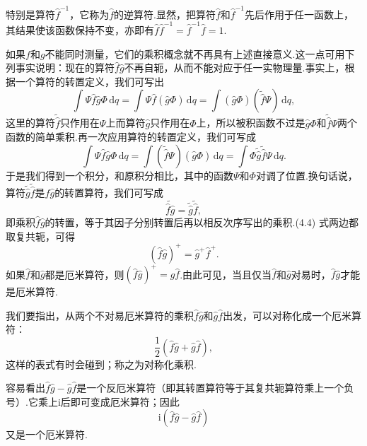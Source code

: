 特别是算符$\hat{f}^{-1}$，它称为$\hat{f}$的逆算符.显然，把算符$\hat{f}$和$\hat{f}^{-1}$先后作用于任一函数上，其结果使该函数保持不变，亦即有$\hat{f}\hat{f}^{-1}=\hat{f}^{-1}\hat{f}=1$.

如果$f$和$g$不能同时测量，它们的乘积概念就不再具有上述直接意义.这一点可用下列事实说明：现在的算符$\hat{f}\hat{g}$不再自轭，从而不能对应于任一实物理量.事实上，根据一个算符的转置定义，我们可写出
\begin{equation*}
  \int\varPsi\hat{f}\hat{g}\varPhi\,\mathrm{d}q
  =\int\varPsi\hat{f}(\hat{g}\varPhi)\,\mathrm{d}q
  =\int(\hat{g}\varPhi)(\tilde{\hat{f}}\varPsi)\,\mathrm{d}q,
\end{equation*}
这里的算符$\tilde{\hat{f}}$只作用在$\varPsi$上而算符$\hat{g}$只作用在$\varPhi$上，所以被积函数不过是$\hat{g}\varPhi$和$\tilde{\hat{f}}\varPsi$两个函数的简单乘积.再一次应用算符的转置定义，我们可写成
\begin{equation*}
  \int\varPsi\hat{f}\hat{g}\varPhi\,\mathrm{d}q
  =\int(\tilde{\hat{f}}\varPsi)(\hat{g}\varPhi)\,\mathrm{d}q
  =\int\varPhi\tilde{\hat{g}}\tilde{\hat{f}}\varPsi\,\mathrm{d}q.
\end{equation*}
于是我们得到一个积分，和原积分相比，其中的函数$\varPsi$和$\varPhi$对调了位置.换句话说，算符$\tilde{\hat{g}}\tilde{\hat{f}}$是$\hat{f}\hat{g}$的转置算符，我们可写成
\begin{equation}
  \widetilde{\hat{f}\hat{g}}=\tilde{\hat{g}}\tilde{\hat{f}},
\end{equation}
即乘积$\hat{f}\hat{g}$的转置，等于其因子分别转置后再以相反次序写出的乘积.(4.4) 式两边都取复共轭，可得
\begin{equation}
  (\hat{f}\hat{g})^{+}=\hat{g}^{+}\hat{f}^{+}.
\end{equation}
如果$\hat{f}$和$\hat{g}$都是厄米算符，则$(\hat{f}\hat{g})^{+}=\hat{g}\hat{f}$.由此可见，当且仅当$\hat{f}$和$\hat{g}$对易时，$\hat{f}\hat{g}$才能是厄米算符.

我们要指出，从两个不对易厄米算符的乘积$\hat{f}\hat{g}$和$\hat{g}\hat{f}$出发，可以对称化成一个厄米算符：
\begin{equation}
  \frac{1}{2}(\hat{f}\hat{g}+\hat{g}\hat{f}),
\end{equation}
这样的表式有时会碰到；称之为对称化乘积.

容易看出$\hat{f}\hat{g}-\hat{g}\hat{f}$是一个反厄米算符（即其转置算符等于其复共轭算符乘上一个负号）.它乘上$\mathrm{i}$后即可变成厄米算符；因此
\begin{equation}
  \mathrm{i}(\hat{f}\hat{g}-\hat{g}\hat{f})
\end{equation}
又是一个厄米算符.

